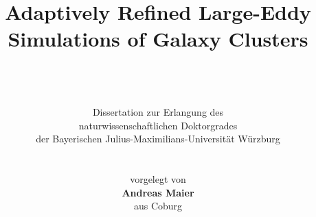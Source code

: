 \title{\Huge{Adaptively Refined Large-Eddy Simulations of Galaxy Clusters}}
\author{
\\
\\
\\
Dissertation zur Erlangung des \\ 
naturwissenschaftlichen Doktorgrades \\ 
der Bayerischen Julius-Maximilians-Universität Würzburg\\ 
\\
\\
vorgelegt von \\ 
\textbf{Andreas Maier} \\ 
aus Coburg\\
\\
\\
\\
\\
\\
\\
\\
}
\iflatexml
\else
\date{}
\publishers{Würzburg 2008}
\uppertitleback{
\vspace{5cm}
Eingereicht am\\
bei der Fakultät für Physik und Astronomie
\\
\\
\\
1. Gutachter: Prof. Dr. Jens Niemeyer\\
2. Gutachter:\\
der Dissertation\\
\\
\\
\\
1. Prüfer: Prof. Dr. Jens Niemeyer\\
2. Prüfer:\\
3. Prüfer:\\
im Promotionskolloquium\\
\\
\\
\\
Tag des Promotionskolloquiums:\\
\\
\\
Doktorurkunde ausgehändigt am \ \underline{\hspace{3cm}}
}
 
\dedication{\foreignlanguage{russian}{Posvyashchayu Olp1ge}}
\fi
